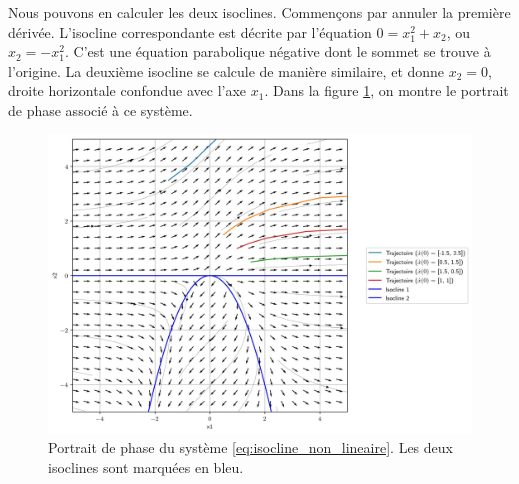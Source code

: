             Nous pouvons en calculer les deux isoclines. Commençons par annuler la première dérivée. L'isocline correspondante est décrite par l'équation $0 = x_1^2 + x_2$, ou $x_2 = -x_1^2$. C'est une équation parabolique négative dont le sommet se trouve à l'origine. La deuxième isocline se calcule de manière similaire, et donne $x_2 = 0$, droite horizontale confondue avec l'axe $x_1$. Dans la figure \ref{fig:exemple_non_lineaire_1}, on montre le portrait de phase associé à ce système.
            \begin{figure}[ht!]
                \centering
                \includegraphics[width=\textwidth]{images/exemple_non_lineaire_1.jpg}
                \caption{Portrait de phase du système \ref{eq:isocline_non_lineaire}. Les deux isoclines sont marquées en bleu.}
                \label{fig:exemple_non_lineaire_1}
            \end{figure}

